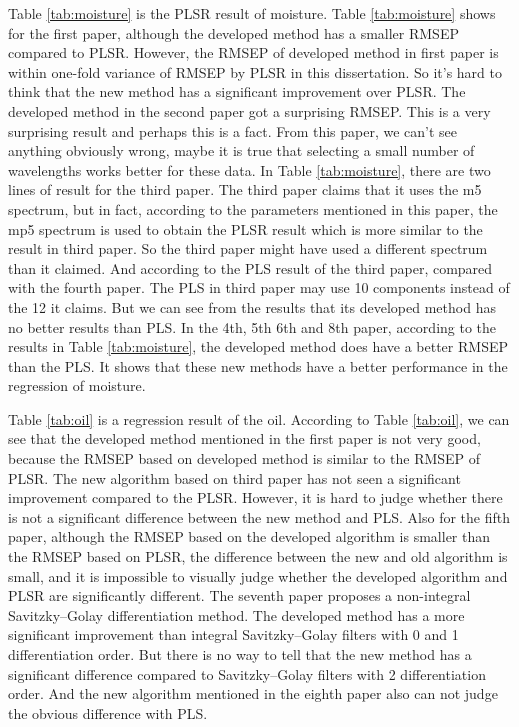 \documentclass[a4paper,12pt,titlepage]{article} %
\numberwithin{equation}{section}  %
\begin{document}
Table \ref{tab:moisture} is the PLSR result of moisture. Table \ref{tab:moisture} shows for the first paper, although the developed method has a smaller RMSEP compared to PLSR. However, the RMSEP of developed method in first paper is within one-fold variance of RMSEP by PLSR in this dissertation. So it's hard to think that the new method has a significant improvement over PLSR. The developed method in the second paper got a surprising RMSEP. This is a very surprising result and perhaps this is a fact. From this paper, we can't see anything obviously wrong, maybe it is true that selecting a small number of wavelengths works better for these data. In Table \ref{tab:moisture}, there are two lines of result for the third paper. The third paper claims that it uses the m5 spectrum, but in fact, according to the parameters mentioned in this paper, the mp5 spectrum is used to obtain the PLSR result which is more similar to the result in third paper. So the third paper might have used a different spectrum than it claimed. And according to the PLS result of the third paper, compared with the fourth paper. The PLS in third paper may use 10 components instead of the 12 it claims. But we can see from the results that its developed method has no better results than PLS. In the 4th, 5th 6th and 8th paper, according to the results in Table \ref{tab:moisture}, the developed method does have a better RMSEP than the PLS. It shows that these new methods have a better performance in the regression of moisture.

	Table \ref{tab:oil} is a regression result of the oil. According to Table \ref{tab:oil}, we can see that the developed method mentioned in the first paper is not very good, because the RMSEP based on developed method is similar to the RMSEP of PLSR. The new algorithm based on third paper has not seen a significant improvement compared to the PLSR. However, it is hard to judge whether there is not a significant difference between the new method and PLS. Also for the fifth paper, although the RMSEP based on the developed algorithm is smaller than the RMSEP based on PLSR, the difference between the new and old algorithm is small, and it is impossible to visually judge whether the developed algorithm and PLSR are significantly different. The seventh paper proposes a non-integral Savitzky–Golay differentiation method. The developed method has a more significant improvement than integral Savitzky–Golay filters with 0 and 1 differentiation order. But there is no way to tell that the new method has a significant difference compared to Savitzky–Golay filters with 2 differentiation order. And the new algorithm mentioned in the eighth paper also can not judge the obvious difference with PLS. 
	
\end{document}
